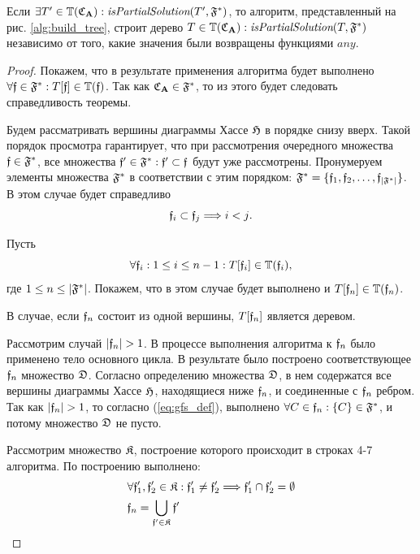 \vspace{1cm}
\begin{theorem}\label{theorem:evil}
Если $\exists T' \in \mathbb{T}(\mathfrak{C}_{\mathbf{A}}): \textit{isPartialSolution}(T', \mathfrak{F}^*)$, то алгоритм, представленный на рис. \ref{alg:build_tree}, строит дерево $T \in \mathbb{T}(\mathfrak{C}_{\mathbf{A}}): \textit{isPartialSolution}(T, \mathfrak{F}^*)$ независимо от того, какие значения были возвращены функциями $any$.
\end{theorem}
\begin{proof}
Покажем, что в результате применения алгоритма будет выполнено $\forall \mathfrak{f} \in \mathfrak{F}^*: T[\mathfrak{f}] \in \mathbb{T}(\mathfrak{f})$. Так как $\mathfrak{C}_{\mathbf{A}} \in \mathfrak{F}^*$, то из этого будет следовать справедливость теоремы.

Будем рассматривать вершины диаграммы Хассе $\mathfrak{H}$ в порядке снизу вверх. Такой порядок просмотра гарантирует, что при рассмотрения очередного множества $\mathfrak{f} \in \mathfrak{F}^*$, все множества $\mathfrak{f}' \in \mathfrak{F}^*: \mathfrak{f}' \subset \mathfrak{f}$ будут уже рассмотрены. Пронумеруем элементы множества $\mathfrak{F}^*$ в соответствии с этим порядком: $\mathfrak{F}^* = \{\mathfrak{f}_1, \mathfrak{f}_2, \ldots, \mathfrak{f}_{|\mathfrak{F}^*|}\}$. В этом случае будет справедливо
\begin{equation}\label{eq:seq_prop}
\mathfrak{f}_i \subset \mathfrak{f}_j \Longrightarrow i < j \text{.}
\end{equation}

Пусть
\begin{equation}\label{eq:induct}
\forall \mathfrak{f}_i: 1 \le i \le n - 1: T[\mathfrak{f}_i] \in \mathbb{T}(\mathfrak{f}_i) \text{,}
\end{equation}
где $1 \le n \le |\mathfrak{F}^*|$. Покажем, что в этом случае будет выполнено и $T[\mathfrak{f}_n] \in \mathbb{T}(\mathfrak{f}_n)$.

В случае, если $\mathfrak{f}_n$ состоит из одной вершины, $T[\mathfrak{f}_n]$ является деревом.

Рассмотрим случай $|\mathfrak{f}_n| > 1$. В процессе выполнения алгоритма к $\mathfrak{f}_n$ было применено тело основного цикла. В результате было построено соответствующее $\mathfrak{f}_n$ множество $\mathfrak{D}$. Согласно определению множества $\mathfrak{D}$, в нем содержатся все вершины диаграммы Хассе $\mathfrak{H}$, находящиеся ниже $\mathfrak{f}_n$, и соединенные с $\mathfrak{f}_n$ ребром. Так как $|\mathfrak{f}_n| > 1$, то согласно (\ref{eq:gfs_def}), выполнено $\forall C \in \mathfrak{f}_n: \{C\} \in \mathfrak{F}^*$, и потому множество $\mathfrak{D}$ не пусто.

Рассмотрим множество $\mathfrak{K}$, построение которого происходит в строках 4-7 алгоритма. По построению выполнено:
\begin{equation}\label{eq:gk_props}
\begin{aligned}
&\forall \mathfrak{f}'_1, \mathfrak{f}'_2 \in \mathfrak{K}: \mathfrak{f}'_1 \ne \mathfrak{f}'_2 \Longrightarrow \mathfrak{f}'_1 \cap \mathfrak{f}'_2 = \emptyset \\
&\mathfrak{f}_n = \bigcup_{\mathfrak{f}' \in \mathfrak{K}} \mathfrak{f}'
\end{aligned}
\end{equation}


\end{proof}
